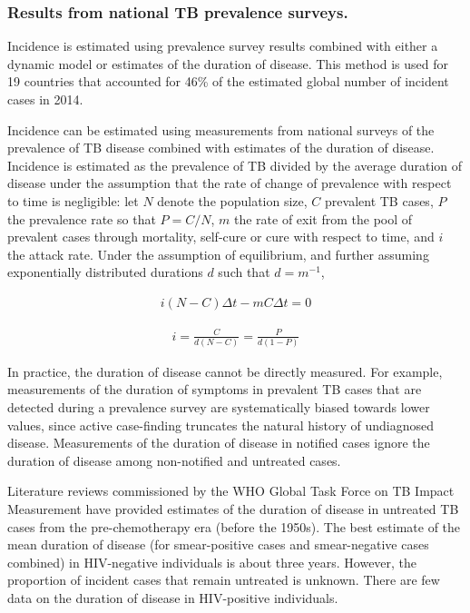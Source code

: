 \subsubsection {Results from national TB prevalence surveys.} Incidence is estimated using prevalence survey results combined with either a dynamic model or estimates of the duration of disease. This method is used for 19 countries that accounted for 46\% of the estimated global number of incident cases in 2014.

Incidence can be estimated using measurements from national surveys of the prevalence of TB disease combined with estimates of the duration of disease. Incidence is estimated as the prevalence of TB divided by the average duration of disease under the assumption that the rate of change of prevalence with respect to time is negligible: let $N$ denote the population size, $C$ prevalent TB cases, $P$ the prevalence rate so that $P = C/N$, $m$ the rate of exit from the pool of prevalent cases through mortality, self-cure or cure with respect to time, and $i$ the attack rate. Under the assumption of equilibrium, and further assuming exponentially distributed durations $d$ such that $d = m^{-1}$,

\begin{align*}
i(N - C)\Delta t - m C\Delta t = 0
\end{align*}

\begin{align*}
i = \frac{C}{d(N - C)} = \frac{P}{d(1 - P)}
\end{align*}

In practice, the duration of disease cannot be directly measured. For example, measurements of the duration of symptoms in prevalent TB cases that are detected during a prevalence survey are systematically biased towards lower values, since active case-finding truncates the natural history of undiagnosed disease. Measurements of the duration of disease in notified cases ignore the duration of disease among non-notified and untreated cases. 

Literature reviews commissioned by the WHO Global Task Force on TB Impact Measurement have provided estimates of the duration of disease in untreated TB cases from the pre-chemotherapy era (before the 1950s). The best estimate of the mean duration of disease (for smear-positive cases and smear-negative cases combined) in HIV-negative individuals is about three years. However, the proportion of incident cases that remain untreated is unknown. There are few data on the duration of disease in HIV-positive individuals. 

